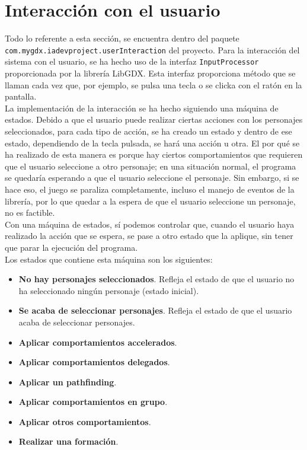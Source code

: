 \medskip
\section{Interacción con el usuario}
\label{interaccion}
Todo lo referente a esta sección, se encuentra dentro del paquete \texttt{com.mygdx.iadevproject.userInteraction} del proyecto. Para la interacción del sistema con el usuario, se ha hecho uso de la interfaz \texttt{InputProcessor} proporcionada por la librería LibGDX. Esta interfaz proporciona método que se llaman cada vez que, por ejemplo, se pulsa una tecla o se clicka con el ratón en la pantalla. \\

La implementación de la interacción se ha hecho siguiendo una máquina de estados. Debido a que el usuario puede realizar ciertas acciones con los personajes seleccionados, para cada tipo de acción, se ha creado un estado y dentro de ese estado, dependiendo de la tecla pulsada, se hará una acción u otra. El por qué se ha realizado de esta manera es porque hay ciertos comportamientos que requieren que el usuario seleccione a otro personaje; en una situación normal, el programa se quedaría esperando a que el usuario seleccione el personaje. Sin embargo, si se hace eso, el juego se paraliza completamente, incluso el manejo de eventos de la librería, por lo que quedar a la espera de que el usuario seleccione un personaje, no es factible. \\

Con una máquina de estados, sí podemos controlar que, cuando el usuario haya realizado la acción que se espera, se pase a otro estado que la aplique, sin tener que parar la ejecución del programa. \\

Los estados que contiene esta máquina son los siguientes:
\begin{itemize}
 \item \textbf{No hay personajes seleccionados}. Refleja el estado de que el usuario no ha seleccionado ningún personaje (estado inicial).
 \item \textbf{Se acaba de seleccionar personajes}. Refleja el estado de que el usuario acaba de seleccionar personajes.
 \item \textbf{Aplicar comportamientos accelerados}.
 \item \textbf{Aplicar comportamientos delegados}.
 \item \textbf{Aplicar un pathfinding}.
 \item \textbf{Aplicar comportamientos en grupo}.
 \item \textbf{Aplicar otros comportamientos}.
 \item \textbf{Realizar una formación}.
\end{itemize}


